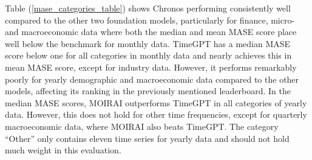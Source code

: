 \documentclass[12pt,a4paper]{article}
\begin{document}
Table (\ref{mase_categories_table}) shows Chronos performing consistently well compared to the other two foundation models, particularly for finance, micro- and macroeconomic data where both the median and mean MASE score place well below the benchmark for monthly data. TimeGPT has a median MASE score below one for all categories in monthly data and nearly achieves this in mean MASE score, except for industry data. However, it performs remarkably poorly for yearly demographic and macroeconomic data compared to the other models, affecting its ranking in the previously mentioned leaderboard. In the median MASE scores, MOIRAI outperforms TimeGPT in all categories of yearly data. However, this does not hold for other time frequencies, except for quarterly macroeconomic data, where MOIRAI also beats TimeGPT. The category “Other” only contains eleven time series for yearly data and should not hold much weight in this evaluation. 
\end{document}
